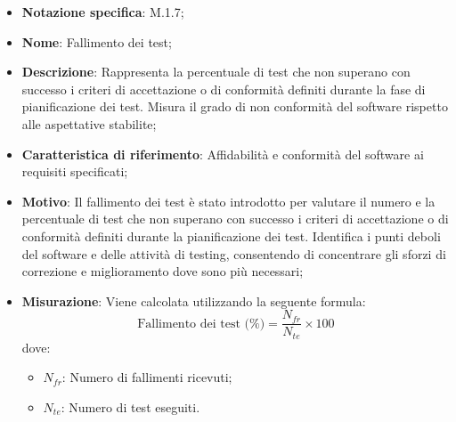 \begin{itemize}
    \item \textbf{Notazione specifica}: M.1.7;
    \item \textbf{Nome}: Fallimento dei test;
    \item \textbf{Descrizione}: Rappresenta la percentuale di test che non superano con successo i criteri di accettazione o di conformità definiti durante la fase di pianificazione dei test. Misura il grado di non conformità del software rispetto alle aspettative stabilite;
    \item \textbf{Caratteristica di riferimento}: Affidabilità e conformità del software ai requisiti specificati;
    \item \textbf{Motivo}: Il fallimento dei test è stato introdotto per valutare il numero e la percentuale di test che non superano con successo i criteri di accettazione o di conformità definiti durante la pianificazione dei test. Identifica i punti deboli del software e delle attività di testing, consentendo di concentrare gli sforzi di correzione e miglioramento dove sono più necessari;
    \item \textbf{Misurazione}: Viene calcolata utilizzando la seguente formula:
    \[
    \text{Fallimento dei test (\%)} = \frac{N_{fr}}{N_{te}} \times 100
    \]
    dove:
    \begin{itemize}
        \item $N_{fr}$: Numero di fallimenti ricevuti;
        \item $N_{te}$: Numero di test eseguiti.
    \end{itemize}
    \end{itemize}